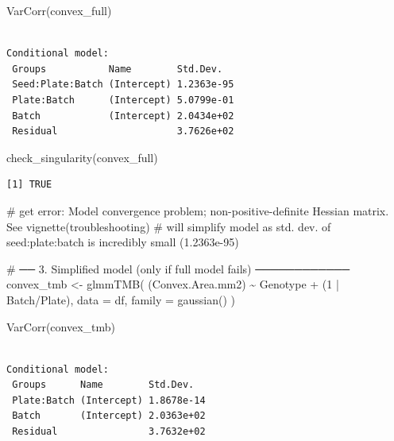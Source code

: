 \documentclass[
  letterpaper,
  DIV=11,
  numbers=noendperiod]{scrartcl}
\newenvironment{Shaded}{\begin{snugshade}}{\end{snugshade}}
\newcommand{\AttributeTok}[1]{\textcolor[rgb]{0.40,0.45,0.13}{#1}}
\newcommand{\CommentTok}[1]{\textcolor[rgb]{0.37,0.37,0.37}{#1}}
\newcommand{\DecValTok}[1]{\textcolor[rgb]{0.68,0.00,0.00}{#1}}
\newcommand{\FunctionTok}[1]{\textcolor[rgb]{0.28,0.35,0.67}{#1}}
\newcommand{\NormalTok}[1]{\textcolor[rgb]{0.00,0.23,0.31}{#1}}
\newcommand{\OtherTok}[1]{\textcolor[rgb]{0.00,0.23,0.31}{#1}}
\newcommand{\SpecialCharTok}[1]{\textcolor[rgb]{0.37,0.37,0.37}{#1}}
\begin{document}
\begin{Shaded}
\begin{Highlighting}[]
\FunctionTok{VarCorr}\NormalTok{(convex\_full)}
\end{Highlighting}
\end{Shaded}

\begin{verbatim}

Conditional model:
 Groups           Name        Std.Dev.  
 Seed:Plate:Batch (Intercept) 1.2363e-95
 Plate:Batch      (Intercept) 5.0799e-01
 Batch            (Intercept) 2.0434e+02
 Residual                     3.7626e+02
\end{verbatim}

\begin{Shaded}
\begin{Highlighting}[]
\FunctionTok{check\_singularity}\NormalTok{(convex\_full) }
\end{Highlighting}
\end{Shaded}

\begin{verbatim}
[1] TRUE
\end{verbatim}

\begin{Shaded}
\begin{Highlighting}[]
\CommentTok{\# get error:   Model convergence problem; non{-}positive{-}definite Hessian matrix. See vignette(\textquotesingle{}troubleshooting\textquotesingle{})}
\CommentTok{\# will simplify model as std. dev. of seed:plate:batch is incredibly small (1.2363e{-}95)}

\CommentTok{\# ── 3. Simplified model (only if full model fails) ────────────}
\NormalTok{convex\_tmb }\OtherTok{\textless{}{-}} \FunctionTok{glmmTMB}\NormalTok{(}
\NormalTok{  (Convex.Area.mm2) }\SpecialCharTok{\textasciitilde{}}\NormalTok{ Genotype }\SpecialCharTok{+}\NormalTok{ (}\DecValTok{1} \SpecialCharTok{|}\NormalTok{ Batch}\SpecialCharTok{/}\NormalTok{Plate),}
  \AttributeTok{data =}\NormalTok{ df, }\AttributeTok{family =} \FunctionTok{gaussian}\NormalTok{()}
\NormalTok{)}

\FunctionTok{VarCorr}\NormalTok{(convex\_tmb)}
\end{Highlighting}
\end{Shaded}

\begin{verbatim}

Conditional model:
 Groups      Name        Std.Dev.  
 Plate:Batch (Intercept) 1.8678e-14
 Batch       (Intercept) 2.0363e+02
 Residual                3.7632e+02
\end{verbatim}
\end{document}
